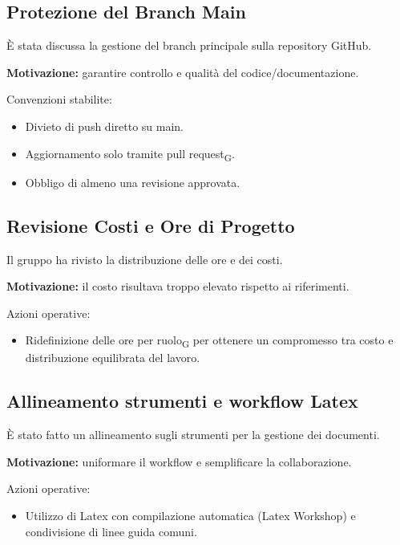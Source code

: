 \subsection{Protezione del Branch Main}
È stata discussa la gestione del branch principale sulla repository GitHub.

\textbf{Motivazione:} garantire controllo e qualità del codice/documentazione.

Convenzioni stabilite:
\begin{itemize}
	\item Divieto di push diretto su main.
	\item Aggiornamento solo tramite pull request\textsubscript{G}.
	\item Obbligo di almeno una revisione approvata.
\end{itemize}

\subsection{Revisione Costi e Ore di Progetto}
Il gruppo ha rivisto la distribuzione delle ore e dei costi.

\textbf{Motivazione:} il costo risultava troppo elevato rispetto ai riferimenti.

Azioni operative:
\begin{itemize}
	\item Ridefinizione delle ore per ruolo\textsubscript{G} per ottenere un compromesso tra costo e distribuzione equilibrata del lavoro.
\end{itemize}

\subsection{Allineamento strumenti e workflow Latex}
È stato fatto un allineamento sugli strumenti per la gestione dei documenti.

\textbf{Motivazione:} uniformare il workflow e semplificare la collaborazione.

Azioni operative:
\begin{itemize}
	\item Utilizzo di Latex con compilazione automatica (Latex Workshop) e condivisione di linee guida comuni.
\end{itemize}

